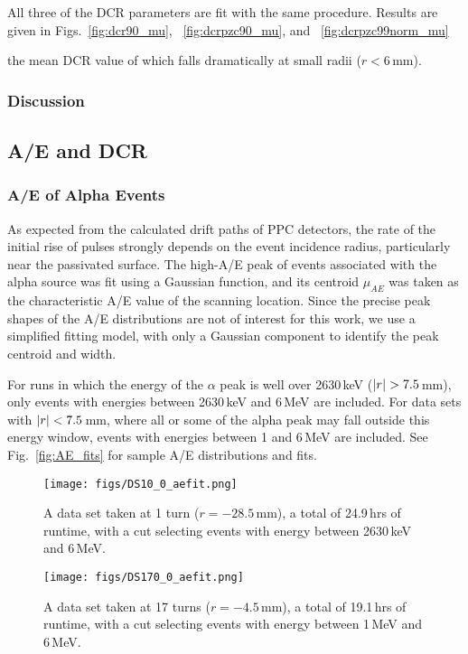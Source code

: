 \documentclass[groupedaddress,rmp,amsmath,amssymb,bibnotes,altaffilletter,twocolumn]{revtex4-1}
\begin{document}
All three of the DCR parameters are fit with the same procedure. Results are given in Figs.~\ref{fig:dcr90_mu}, ~\ref{fig:dcrpzc90_mu}, and ~\ref{fig:dcrpzc99norm_mu}




 the mean DCR value of which falls dramatically at small radii ($r<6$\,mm). 

 
\subsubsection{Discussion}


\subsection{A/E and DCR} 
\subsubsection{A/E of Alpha Events}
As expected from the calculated drift paths of PPC detectors, the rate of the initial rise of pulses strongly depends on the event incidence radius, particularly near the passivated surface. The high-A/E peak of events associated with the alpha source was fit using a Gaussian function, and its centroid $\mu_{AE}$ was taken as the characteristic A/E value of the scanning location. Since the precise peak shapes of the A/E distributions are not of interest for this work, we use a simplified fitting model, with only a Gaussian component to identify the peak centroid and width. 

For runs in which the energy of the $\alpha$ peak is well over 2630\,keV ($\abs{r} > 7.5$\,mm), only events with energies between 2630\,keV and 6\,MeV are included. For data sets with $\abs{r} < 7.5$\,mm, where all or some of the alpha peak may fall outside this energy window, events with energies between 1 and 6\,MeV are included. See Fig.~\ref{fig:AE_fits} for sample A/E distributions and fits. 

\begin{figure*}[]
 \centering
 \begin{subfigure}[]{.45\textwidth}
 \texttt{[image: figs/DS10\_0\_aefit.png]}
 \caption{A data set taken at 1 turn ($r = -28.5$\,mm), a total of 24.9\,hrs of runtime, with a cut selecting events with energy between 2630\,keV and 6\,MeV.}
\end{subfigure}
 \begin{subfigure}[]{.45\textwidth}
 \texttt{[image: figs/DS170\_0\_aefit.png]}
  \caption{A data set taken at 17 turns ($r = -4.5$\,mm), a total of 19.1\,hrs of runtime, with a cut selecting events with energy between 1\,MeV and 6\,MeV.} 
\end{subfigure}
\caption{Sample A/E distributions and Gaussian peak fits to alpha events.}
 \label{fig:AE_fits}
\end{figure*}
\end{document}
